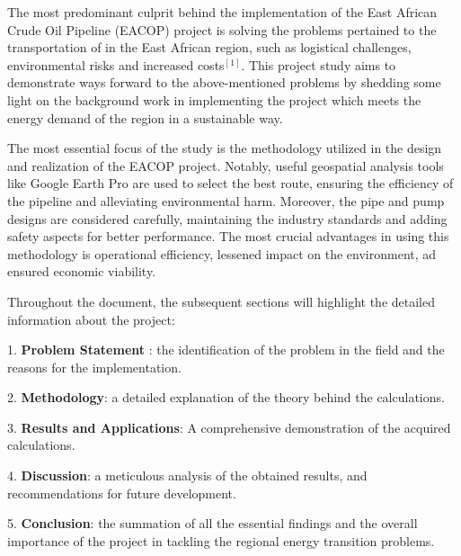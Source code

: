 \documentclass[12pt]{article}
\begin{document}
      {\fontsize{12pt}{12pt}

      \hspace*{1em} The most predominant culprit behind the implementation of the East African Crude Oil Pipeline (EACOP) project is solving the problems pertained to the transportation of in the East African region, such as logistical challenges, environmental risks and increased costs$^{[1]}$. This project study aims to demonstrate ways forward to the above-mentioned problems by shedding some light on the background work in implementing the project which meets the energy demand of the region in a sustainable way. 

      The most essential focus of the study is the methodology utilized in the design and realization of the EACOP project. Notably, useful geospatial analysis tools like Google Earth Pro are used to select the best route, ensuring the efficiency of the pipeline and alleviating environmental harm. Moreover, the pipe and pump designs are considered carefully, maintaining the industry standards and adding safety aspects for better performance. The most crucial advantages in using this methodology is operational efficiency, lessened impact on the environment, ad ensured economic viability.

      Throughout the document, the subsequent sections will highlight the detailed information about the project:

      1. \textbf{Problem Statement} : the identification of the problem in the field and the reasons for the implementation.

      2. \textbf{Methodology}: a detailed explanation of the theory behind the calculations.

      3. \textbf{Results and Applications}: A comprehensive demonstration of the acquired calculations.

      4. \textbf{Discussion}: a meticulous analysis of the obtained results, and recommendations for future development.

      5. \textbf{Conclusion}: the summation of all the essential findings and the overall importance of the project in tackling the regional energy transition problems. 
      }
\end{document}

